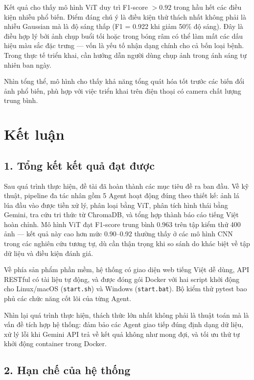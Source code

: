 \documentclass[13pt,a4paper]{extreport}
\begin{document}
Kết quả cho thấy mô hình ViT duy trì F1-score $> 0.92$ trong hầu hết các điều kiện nhiễu phổ biến. Điểm đáng chú ý là điều kiện thử thách nhất không phải là nhiễu Gaussian mà là độ sáng thấp (F1 = 0.922 khi giảm 50\% độ sáng). Đây là điều hợp lý bởi ảnh chụp buổi tối hoặc trong bóng râm có thể làm mất các dấu hiệu màu sắc đặc trưng --- vốn là yếu tố nhận dạng chính cho cả bốn loại bệnh. Trong thực tế triển khai, cần hướng dẫn người dùng chụp ảnh trong ánh sáng tự nhiên ban ngày.

Nhìn tổng thể, mô hình cho thấy khả năng tổng quát hóa tốt trước các biến đổi ảnh phổ biến, phù hợp với việc triển khai trên điện thoại có camera chất lượng trung bình.

\chapter*{Kết luận}

\section*{1. Tổng kết kết quả đạt được}

Sau quá trình thực hiện, đề tài đã hoàn thành các mục tiêu đề ra ban đầu. Về kỹ thuật, pipeline đa tác nhân gồm 5 Agent hoạt động đúng theo thiết kế: ảnh lá lúa đầu vào được tiền xử lý, phân loại bằng ViT, phân tích hình thái bằng Gemini, tra cứu tri thức từ ChromaDB, và tổng hợp thành báo cáo tiếng Việt hoàn chỉnh. Mô hình ViT đạt F1-score trung bình 0.963 trên tập kiểm thử 400 ảnh --- kết quả này cao hơn mức 0.90--0.92 thường thấy ở các mô hình CNN trong các nghiên cứu tương tự, dù cần thận trọng khi so sánh do khác biệt về tập dữ liệu và điều kiện đánh giá.

Về phía sản phẩm phần mềm, hệ thống có giao diện web tiếng Việt dễ dùng, API RESTful có tài liệu tự động, và được đóng gói Docker với hai script khởi động cho Linux/macOS (\texttt{start.sh}) và Windows (\texttt{start.bat}). Bộ kiểm thử pytest bao phủ các chức năng cốt lõi của từng Agent.

Nhìn lại quá trình thực hiện, thách thức lớn nhất không phải là thuật toán mà là vấn đề tích hợp hệ thống: đảm bảo các Agent giao tiếp đúng định dạng dữ liệu, xử lý lỗi khi Gemini API trả về kết quả không như mong đợi, và tối ưu thứ tự khởi động container trong Docker.

\section*{2. Hạn chế của hệ thống}
\end{document}
